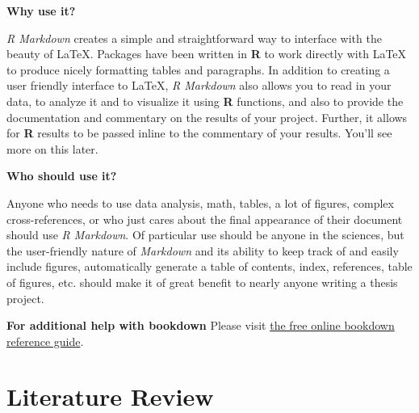 \documentclass[12pt,twoside]{reedthesis}
\begin{document}
\textbf{Why use it?}

\emph{R Markdown} creates a simple and straightforward way to interface with the beauty of LaTeX. Packages have been written in \textbf{R} to work directly with LaTeX to produce nicely formatting tables and paragraphs. In addition to creating a user friendly interface to LaTeX, \emph{R Markdown} also allows you to read in your data, to analyze it and to visualize it using \textbf{R} functions, and also to provide the documentation and commentary on the results of your project. Further, it allows for \textbf{R} results to be passed inline to the commentary of your results. You'll see more on this later.

\textbf{Who should use it?}

Anyone who needs to use data analysis, math, tables, a lot of figures, complex cross-references, or who just cares about the final appearance of their document should use \emph{R Markdown}. Of particular use should be anyone in the sciences, but the user-friendly nature of \emph{Markdown} and its ability to keep track of and easily include figures, automatically generate a table of contents, index, references, table of figures, etc. should make it of great benefit to nearly anyone writing a thesis project.

\textbf{For additional help with bookdown}
Please visit \href{https://bookdown.org/yihui/bookdown/}{the free online bookdown reference guide}.

\hypertarget{lit-review}{%
\chapter{Literature Review}\label{lit-review}}
\end{document}
